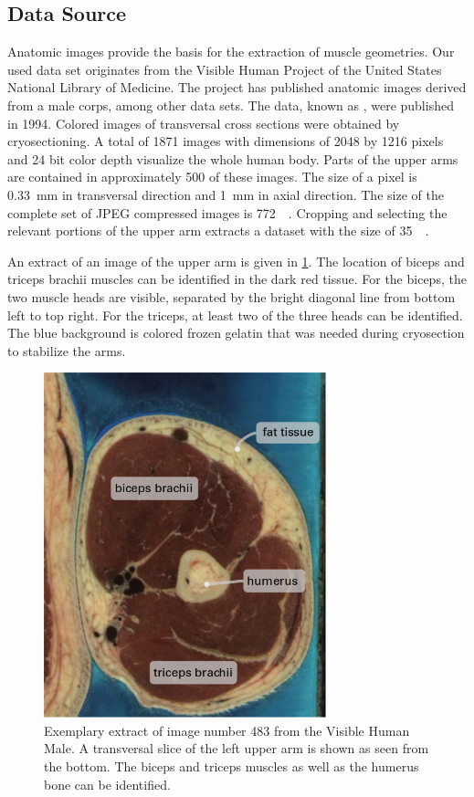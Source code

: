 \subsection{Data Source}
Anatomic images provide the basis for the extraction of muscle geometries.
Our used data set originates from the Visible Human Project \cite{visible_human_male} of 
the United States National Library of Medicine. 
The project has published anatomic images derived from a male corps, among other data sets.
The data, known as , were published in 1994.
Colored images of transversal cross sections were obtained by cryosectioning.
A total of \num{1871} images with dimensions of \num{2048} by \num{1216} pixels and 24 bit color depth visualize the whole human body. Parts of the upper arms are contained in approximately 500 of these images. The size of a pixel is \SI{0.33}{\milli\meter} in transversal direction and \SI{1}{\milli\meter} in axial direction. The size of the complete set of JPEG compressed images is \SI{772}{\mega\byte}. Cropping and selecting the relevant portions of the upper arm extracts a dataset with the size of \SI{35}{\mega\byte}.

An extract of an image of the upper arm is given in \cref{fig:vhp_image}. 
The location of biceps and triceps brachii muscles can be identified in the dark red tissue. For the biceps, the two muscle heads are visible, separated by the bright diagonal line from bottom left to top right. For the triceps, at least two of the three heads can be identified. The blue background is colored frozen gelatin that was needed during cryosection to stabilize the arms.

\begin{figure}%
  \centering%
  \includegraphics[height=10cm]{images/fiber_creation/vhp.png}%
  \caption{Exemplary extract of image number 483 from the Visible Human Male. A transversal slice of the left upper arm is shown as seen from the bottom. The biceps and triceps muscles as well as the humerus bone can be identified. }%
  \label{fig:vhp_image}%
\end{figure}%

